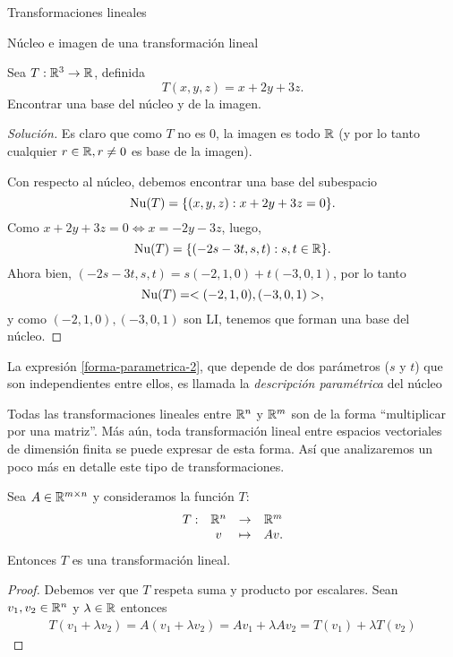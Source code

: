 \begin{chapter}{Transformaciones lineales}
\begin{section}{N\'ucleo e imagen de una transformaci\'on lineal}
\begin{definicion}
        \end{definicion}
                
        \begin{ejemplo*}
            Sea $T: \mathbb R^3 \to \mathbb R$, definida
            $$
            T(x,y,z) = x +2y +3z.
            $$
            Encontrar una base del núcleo y de la imagen.
            \begin{proof}[Solución]
                Es claro que como $T$ no es 0, la imagen es todo $\mathbb R$ (y por lo tanto cualquier $r\in \mathbb R, r \ne 0$ es base de la imagen). 
                
                Con respecto al núcleo,  debemos encontrar una base del subespacio
                $$
                \operatorname{Nu}(T) = \{(x,y,z): x+2y+3z =0\}.
                $$
                Como $x+2y+3z =0 \Leftrightarrow x = -2y-3z$, luego, 
                \begin{equation}\label{forma-parametrica-2}
                    \operatorname{Nu}(T) =  \{(-2s-3t,s,t): s,t \in \mathbb R\}.
                \end{equation}
                Ahora bien, $(-2s-3t,s,t) = s(-2,1,0)+t(-3,0,1)$, por lo tanto 
                \begin{equation*}
                \operatorname{Nu}(T) =  <(-2,1,0),(-3,0,1)>,
                \end{equation*}
                y  como $(-2,1,0),(-3,0,1)$ son LI, tenemos que forman una base del núcleo. 
            \end{proof}
        
        La expresión \eqref{forma-parametrica-2},  que depende de dos parámetros ($s$ y $t$) que son independientes entre ellos, es llamada la \textit{descripción paramétrica} del núcleo	
        \end{ejemplo*}

        Todas las transformaciones lineales entre $\mathbb R^n$ y $\mathbb R^m$ son de la forma ``multiplicar por una matriz''. Más aún,  toda transformación lineal entre espacios vectoriales de dimensión finita se puede expresar de esta forma. Así que analizaremos un poco más en detalle este tipo de transformaciones.
\begin{observacion}
Sea $A\in\mathbb R^{m\times n}$ y consideramos la función $T$:
\begin{align*}
\begin{array}{rccc}
    T : &\mathbb R^n &\to &\mathbb R^m \\
        &v &\mapsto &Av.
\end{array}
\end{align*}
Entonces $T$ es una transformación lineal. 
\end{observacion}
\begin{proof}
    Debemos ver que $T$ respeta suma y producto por escalares.
Sean $v_1,v_2\in\mathbb R^n$ y $\lambda\in\mathbb R$ entonces
\begin{align*}
T(v_1+\lambda v_2)=A(v_1+\lambda v_2)=
Av_1+\lambda Av_2=T(v_1)+\lambda T(v_2)
\end{align*}
\end{proof}


\end{section}
\end{chapter}
